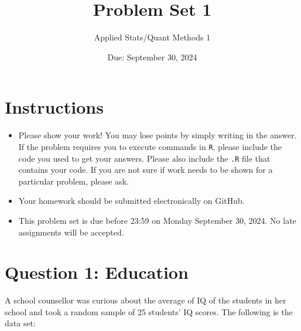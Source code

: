 \documentclass[12pt,letterpaper]{article}
\title{Problem Set 1}
\date{Due: September 30, 2024}
\author{Applied Stats/Quant Methods 1}
\begin{document}
	\maketitle
	
	\section*{Instructions}
	\begin{itemize}
	\item Please show your work! You may lose points by simply writing in the answer. If the problem requires you to execute commands in \texttt{R}, please include the code you used to get your answers. Please also include the \texttt{.R} file that contains your code. If you are not sure if work needs to be shown for a particular problem, please ask.
\item Your homework should be submitted electronically on GitHub.
\item This problem set is due before 23:59 on Monday September 30, 2024. No late assignments will be accepted.
	\end{itemize}
	
	\vspace{1cm}
	\section*{Question 1: Education}

A school counsellor was curious about the average of IQ of the students in her school and took a random sample of 25 students' IQ scores. The following is the data set:

\vspace{1cm}
\end{document}
